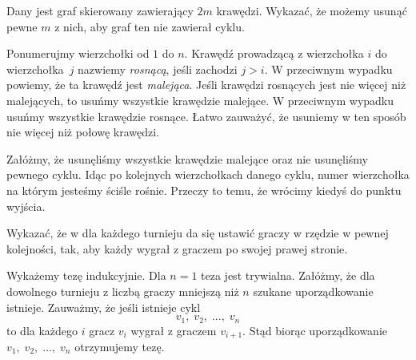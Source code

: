 \newpage
{}

\begin{problem}{1}
	Dany jest graf skierowany zawierający $2m$ krawędzi. Wykazać, że możemy usunąć pewne $m$ z nich, aby graf ten nie zawierał cyklu.
\end{problem}

\noindent
Ponumerujmy wierzchołki od $1$ do $n$. Krawędź prowadzącą z wierzchołka $i$ do wierzchołka~$j$ nazwiemy \textit{rosnącą}, jeśli zachodzi $j > i$. W przeciwnym wypadku powiemy, że ta krawędź jest \textit{malejąca}. Jeśli krawędzi rosnących jest nie więcej niż malejących, to usuńmy wszystkie krawędzie malejące. W przeciwnym wypadku usuńmy wszystkie krawędzie rosnące. Łatwo zauważyć, że usuniemy w ten sposób nie więcej niż połowę krawędzi.

\vspace{10px}
\noindent
Załóżmy, że usunęliśmy wszystkie krawędzie malejące oraz nie usunęliśmy pewnego cyklu. Idąc po kolejnych wierzchołkach danego cyklu, numer wierzchołka na którym jesteśmy ściśle rośnie. Przeczy to temu, że wrócimy kiedyś do punktu wyjścia.

\begin{problem}{2}
	Wykazać, że w dla każdego turnieju da się ustawić graczy w rzędzie w pewnej kolejności, tak, aby każdy wygrał z graczem po swojej prawej stronie.
\end{problem}

\noindent
Wykażemy tezę indukcyjnie. Dla $n = 1$ teza jest trywialna. Załóżmy, że dla dowolnego turnieju z liczbą graczy mniejszą niż $n$ szukane uporządkowanie istnieje. 
Zauważmy, że jeśli istnieje cykl
\[
	v_1, \; v_2, \; ..., \; v_n
\]
to dla każdego $i$ gracz $v_{i}$ wygrał z graczem $v_{i + 1}$. Stąd biorąc uporządkowanie $v_1, \; v_2, \; ..., \; v_n$ otrzymujemy tezę.

\begin{center}
\end{center}

